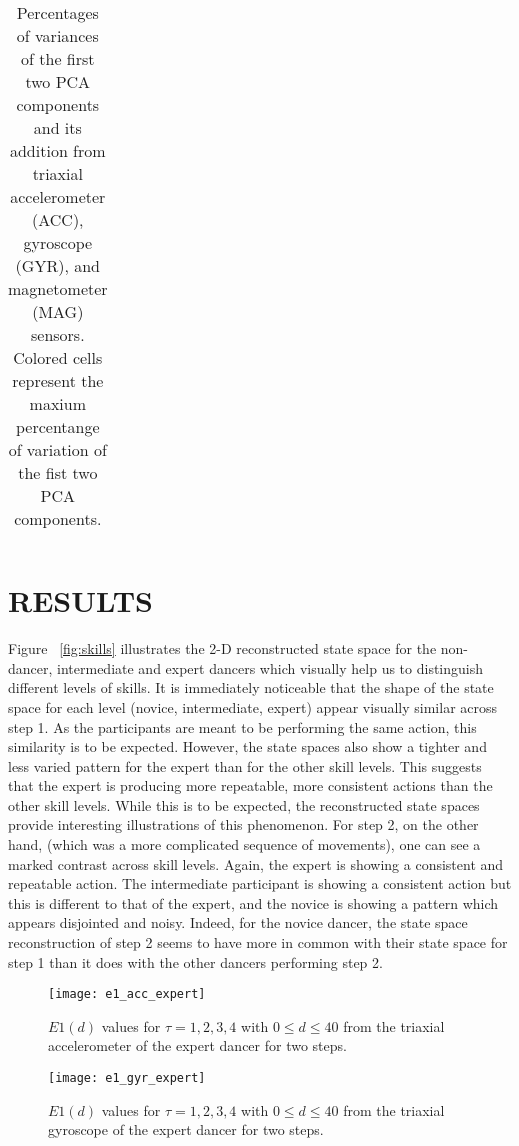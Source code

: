 \documentclass{sigchi}
\begin{document}
\begin{table}
\begin{tabular}{l c c c c c c }
\bottomrule
\end{tabular}

  \caption{Percentages of variances of the first two PCA components and its addition
       from triaxial accelerometer (ACC), gyroscope (GYR), and magnetometer (MAG) sensors.
  Colored cells represent the maxium percentange of variation of the fist two PCA components.}
  \label{tab:table2}
\end{table}



\section{RESULTS}
Figure ~\ref{fig:skills} illustrates the 2-D reconstructed state space for the 
non-dancer, intermediate 
and expert dancers 
which visually 
help us to distinguish different levels of skills. 
It is immediately noticeable that the shape of the state space for each level (novice, intermediate, expert) 
appear visually similar across step 1.  
As the participants are meant to be performing the same action, this similarity is to be expected.  
However, the state spaces also show a tighter and less varied pattern for the expert than for the other skill levels.  
This suggests that the expert is producing more repeatable, more consistent actions than the other skill levels.  
While this is to be expected, the reconstructed state spaces provide interesting illustrations of this phenomenon.  
For step 2, on the other hand, (which was a more complicated sequence of movements),
one can see a marked contrast across skill levels.  
Again, the expert is showing a consistent and repeatable action.  
The intermediate participant is showing a consistent action but this is different to that of the expert, 
and the novice is showing a pattern which appears disjointed and noisy.  
Indeed, for the novice dancer, the state space reconstruction of step 2 seems to have more in common 
with their state space for step 1 than it does with the other dancers performing step 2.  
  \begin{figure}[htbp!] 
  \centering    
  \texttt{[image: e1\_acc\_expert]}
  \caption[PA]{$E1(d)$ values for $\tau=1,2,3,4$ with $0 \leq d \leq 40$
  from the triaxial accelerometer of the expert dancer for two steps.}
  \label{fig:e1acc}
  \end{figure}
    \begin{figure}[htbp!] 
  \centering    
  \texttt{[image: e1\_gyr\_expert]}
  \caption[PA]{$E1(d)$ values for $\tau=1,2,3,4$ with $0 \leq d \leq 40$
  from the triaxial gyroscope of the expert dancer for two steps.}
  \label{fig:e1gyr}
  \end{figure}
\end{document}
